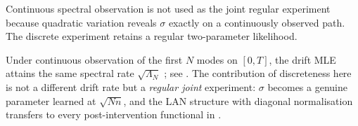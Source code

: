 Continuous spectral observation is not used as the joint regular experiment because quadratic variation reveals $\sigma$ exactly on a continuously observed path. The discrete experiment retains a regular two-parameter likelihood.

\begin{remark}\label{rem:hr-compare}
Under continuous observation of the first $N$ modes on $[0,T]$, the drift MLE attains the same spectral rate $\sqrt{\Lambda_N}$ \citep{HuebnerRozovskii1995}; see \citet{Lototsky2009,Cialenco2018}. The contribution of discreteness here is not a different drift rate but a \emph{regular joint} experiment: $\sigma$ becomes a genuine parameter learned at $\sqrt{Nn}$, and the LAN structure with diagonal normalisation transfers to every post-intervention functional in .
\end{remark}
